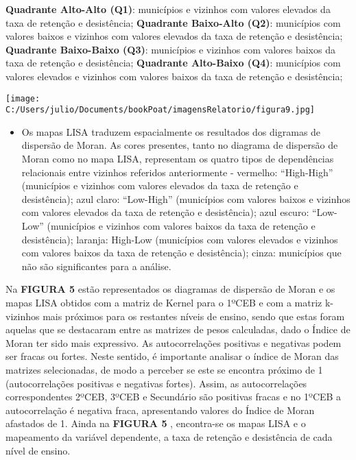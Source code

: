 \documentclass[
]{book}
\providecommand{\tightlist}{%
  \setlength{\itemsep}{0pt}\setlength{\parskip}{0pt}}
\begin{document}
\textbf{Quadrante Alto-Alto (Q1)}: municípios e vizinhos com valores elevados da taxa de retenção e desistência;
\textbf{Quadrante Baixo-Alto (Q2)}: municípios com valores baixos e vizinhos com valores elevados da taxa de retenção e desistência;
\textbf{Quadrante Baixo-Baixo (Q3)}: municípios e vizinhos com valores baixos da taxa de retenção e desistência;
\textbf{Quadrante Alto-Baixo (Q4)}: municípios com valores elevados e vizinhos com valores baixos da taxa de retenção e desistência;

\texttt{[image: C:/Users/julio/Documents/bookPoat/imagensRelatorio/figura9.jpg]}

\begin{itemize}
\tightlist
\item
  Os mapas LISA traduzem espacialmente os resultados dos digramas de dispersão de Moran. As cores presentes, tanto no diagrama de dispersão de Moran como no mapa LISA, representam os quatro tipos de dependências relacionais entre vizinhos referidos anteriormente - vermelho: ``High-High'' (municípios e vizinhos com valores elevados da taxa de retenção e desistência); azul claro: ``Low-High'' (municípios com valores baixos e vizinhos com valores elevados da taxa de retenção e desistência); azul escuro: ``Low-Low'' (municípios e vizinhos com valores baixos da taxa de retenção e desistência); laranja: High-Low (municípios com valores elevados e vizinhos com valores baixos da taxa de retenção e desistência); cinza: municípios que não são significantes para a análise.
\end{itemize}

Na \textbf{FIGURA 5} estão representados os diagramas de dispersão de Moran e os mapas LISA obtidos com a matriz de Kernel para o 1ºCEB e com a matriz k-vizinhos mais próximos para os restantes níveis de ensino, sendo que estas foram aquelas que se destacaram entre as matrizes de pesos calculadas, dado o Índice de Moran ter sido mais expressivo. As autocorrelações positivas e negativas podem ser fracas ou fortes. Neste sentido, é importante analisar o índice de Moran das matrizes selecionadas, de modo a perceber se este se encontra próximo de 1 (autocorrelações positivas e negativas fortes). Assim, as autocorrelações correspondentes 2ºCEB, 3ºCEB e Secundário são positivas fracas e no 1ºCEB a autocorrelação é negativa fraca, apresentando valores do Índice de Moran afastados de 1. Ainda na \textbf{FIGURA 5} , encontra-se os mapas LISA e o mapeamento da variável dependente, a taxa de retenção e desistência de cada nível de ensino.
\end{document}
